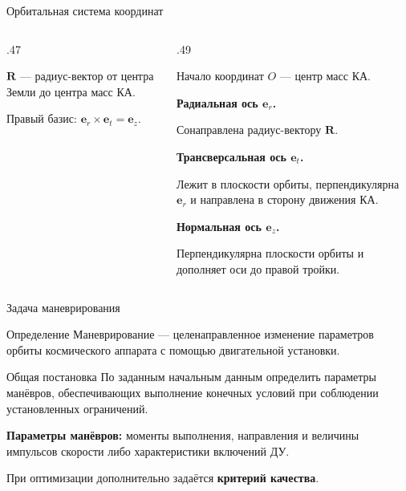 \documentclass[11pt,aspectratio=169,t]{beamer}
\begin{document}
\begin{frame}{Орбитальная система координат}
\begin{columns}[T,onlytextwidth]
\begin{column}{.47\textwidth}
\centering

\par\smallskip
{\color{coursemuted}
$\mathbf R$ --- радиус-вектор от центра Земли до центра масс КА.\par}
\smallskip
Правый базис: $\mathbf e_r\times\mathbf e_t=\mathbf e_z$.
\end{column}
\begin{column}{.49\textwidth}
\begin{block}{Начало координат}
$O$ --- центр масс КА.
\end{block}
\textbf{Радиальная ось $\mathbf e_r$.}\par
Сонаправлена радиус-вектору $\mathbf R$.
\par
\textbf{Трансверсальная ось $\mathbf e_t$.}\par
{\justifying
Лежит в плоскости орбиты, перпендикулярна $\mathbf e_r$ и направлена в сторону движения КА.\par}
\par
\textbf{Нормальная ось $\mathbf e_z$.}\par
{\justifying
Перпендикулярна плоскости орбиты и дополняет оси до правой тройки.\par}
\end{column}
\end{columns}
\end{frame}

\begin{frame}{Задача маневрирования}
\begin{block}{Определение}
\justifying
Маневрирование --- целенаправленное изменение параметров орбиты космического аппарата с помощью двигательной установки.
\end{block}
\begin{block}{Общая постановка}
\justifying
По заданным начальным данным определить параметры манёвров, обеспечивающих выполнение конечных условий при соблюдении установленных ограничений.
\end{block}
\textbf{Параметры манёвров:} моменты выполнения, направления и величины импульсов скорости либо характеристики включений ДУ.
\par\medskip
При оптимизации дополнительно задаётся \textbf{критерий качества}.
\end{frame}
\end{document}
